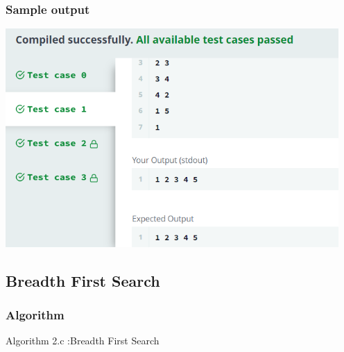 \documentclass[14pt, letterpaper]{article}
\begin{document}
\subsubsection{Sample output}
\includegraphics[width=5in]{images/dfs1.png}
\newpage
\subsection{Breadth First Search}
\subsubsection{Algorithm}
\hline 
\vspace{0.1cm}
\hspace{0.5cm}Algorithm 2.c :Breadth First Search
\vspace{0.1cm}
\hline
\end{document}
